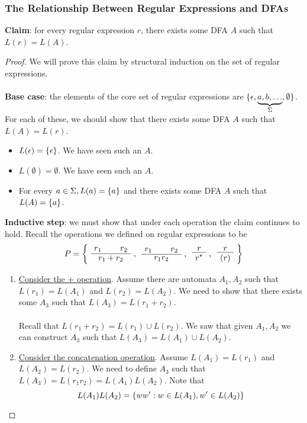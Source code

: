 \documentclass[]{article}
\DeclarePairedDelimiter{\set}{\lbrace}{\rbrace}
\theoremstyle{definition}
\newcommand{\lecture}[1]{\marginpar{{\footnotesize $\leftarrow$ \underline{#1}}}}
\begin{document}
      \subsubsection{The Relationship Between Regular Expressions and DFAs} \lecture{September 26, 2013}
        \textbf{Claim}: for every regular expression $r$, there exists some DFA $A$ such that $L(r) = L(A)$.

        \begin{proof}
          We will prove this claim by structural induction on the set of regular expressions.
          \\ \\
          \textbf{Base case}: the elements of the core set of regular expressions are $\set{ \epsilon, \underbrace{a, b, \ldots}_{\Sigma}, \emptyset}$. For each of these, we should show that there exists some DFA $A$ such that $L(A) = L(r)$.
          \begin{itemize}
            \item $L(\epsilon) = \set{ \epsilon }$. We have seen such an $A$.
            \item $L(\emptyset) = \emptyset$. We have seen such an $A$.
            \item For every $a \in \Sigma, L(a) = \set{a}$ and there exists some DFA $A$ such that $L(A) = \set{a}$.
          \end{itemize}

          \textbf{Inductive step}: we must show that under each operation the claim continues to hold. Recall the operations we defined on regular expressions to be
          $$
            P = \bigg\{ \text{\AxiomC{$r_1$} \AxiomC{$r_2$} \BinaryInfC{$r_1 + r_2$} \DisplayProof, \AxiomC{$r_1$} \AxiomC{$r_2$} \BinaryInfC{$r_1 r_2$} \DisplayProof, \AxiomC{$r$} \UnaryInfC{$r^\star$} \DisplayProof, \AxiomC{$r$} \UnaryInfC{$(r)$} \DisplayProof} \bigg\}
          $$

          \begin{enumerate}
            \item \underline{Consider the + operation}. Assume there are automata $A_1, A_2$ such that $L(r_1) = L(A_1)$ and $L(r_2) = L(A_2)$. We need to show that there exists some $A_3$ such that $L(A_3) = L(r_1 + r_2)$.
            \\ \\
            Recall that $L(r_1 + r_2) = L(r_1) \cup L(r_2)$. We saw that given $A_1, A_2$ we can construct $A_3$ such that $L(A_3) = L(A_1) \cup L(A_2)$.

            \item \underline{Consider the concatenation operation}. Assume $L(A_1) = L(r_1)$ and $L(A_2) = L(r_2)$. We need to define $A_3$ such that $L(A_3) = L(r_1 r_2) = L(A_1) L(A_2)$. Note that
            $$
              L(A_1) L(A_2) = \set{ w w' : w \in L(A_1), w' \in L(A_2) }
            $$


\end{enumerate}
\end{proof}
\end{document}
